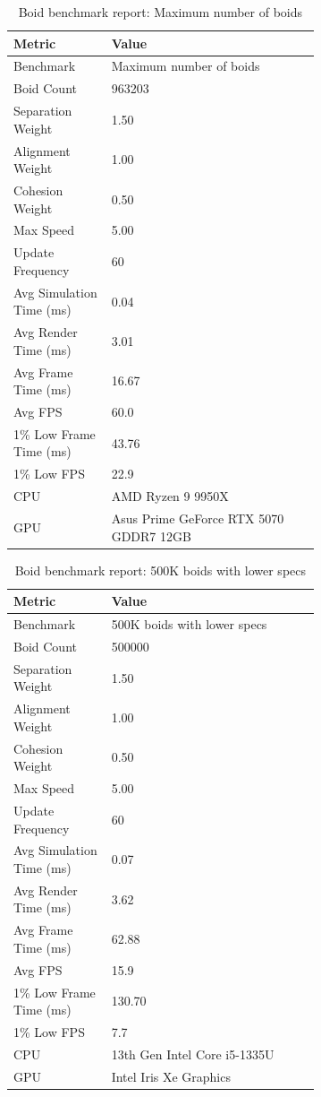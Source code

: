 \documentclass[a4paper, 12pt]{article}
\begin{document}
\begin{table}[htbp]
\centering
{}
\begin{tabular}{l p{0.68\linewidth}}
\hline
Metric & Value \\
\hline
Benchmark & Maximum number of boids \\
Boid Count & 963203 \\
Separation Weight & 1.50 \\
Alignment Weight & 1.00 \\
Cohesion Weight & 0.50 \\
Max Speed & 5.00 \\
Update Frequency & 60 \\
Avg Simulation Time (ms) & 0.04 \\
Avg Render Time (ms) & 3.01 \\
Avg Frame Time (ms) & 16.67 \\
Avg FPS & 60.0 \\
1\% Low Frame Time (ms) & 43.76 \\
1\% Low FPS & 22.9 \\
CPU & AMD Ryzen 9 9950X \\
GPU & Asus Prime GeForce RTX 5070 GDDR7 12GB\\
\hline
\end{tabular}
\caption{Boid benchmark report: Maximum number of boids}
\label{tab:boid-benchmark-report-max-standard}
\end{table}

\begin{table}[htbp]
\centering
{}
\begin{tabular}{l p{0.68\linewidth}}
\hline
Metric & Value \\
\hline
Benchmark & 500K boids with lower specs \\
Boid Count & 500000 \\
Separation Weight & 1.50 \\
Alignment Weight & 1.00 \\
Cohesion Weight & 0.50 \\
Max Speed & 5.00 \\
Update Frequency & 60 \\
Avg Simulation Time (ms) & 0.07 \\
Avg Render Time (ms) & 3.62 \\
Avg Frame Time (ms) & 62.88 \\
Avg FPS & 15.9 \\
1\% Low Frame Time (ms) & 130.70 \\
1\% Low FPS & 7.7 \\
CPU & 13th Gen Intel Core i5-1335U \\
GPU & Intel Iris Xe Graphics \\
\hline
\end{tabular}
\caption{Boid benchmark report: 500K boids with lower specs}
\label{tab:boid-benchmark-report-500K-weak}
\end{table}
\end{document}
